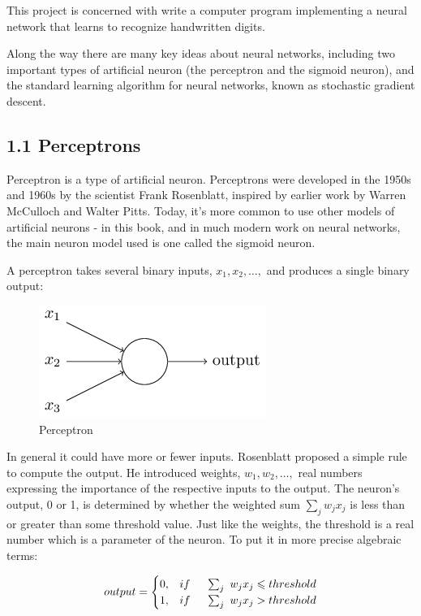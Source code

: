 \documentclass[12 pt]{article}
\begin{document}
This project is concerned with write a computer program implementing a
neural network that learns to recognize handwritten digits.

Along the way there are many key ideas about neural networks, including
two important types of artificial neuron (the perceptron and the sigmoid
neuron), and the standard learning algorithm for neural networks, known
as stochastic gradient descent.

\subsection{1.1 Perceptrons}\label{perceptrons}

Perceptron is a type of artificial neuron. Perceptrons were developed in
the 1950s and 1960s by the scientist Frank Rosenblatt, inspired by
earlier work by Warren McCulloch and Walter Pitts. Today, it's more
common to use other models of artificial neurons - in this book, and in
much modern work on neural networks, the main neuron model used is one
called the sigmoid neuron.

A perceptron takes several binary inputs, $ x_1, x_2, \ldots{}, $
and produces a single binary output:

\begin{figure}[htp]
\centering
\includegraphics{./figs/tikz0.png}
\caption{Perceptron}
\end{figure}

In general it could have more or fewer inputs. Rosenblatt proposed a
simple rule to compute the output. He introduced weights,
$ w_1,w_2,\ldots{},$ real numbers expressing the importance of the respective
inputs to the output. The neuron's output, 0 or 1, is determined by
whether the weighted sum $ \sum_j w_j x_j $ is less than or
greater than some threshold value. Just like the weights, the threshold
is a real number which is a parameter of the neuron. To put it in more
precise algebraic terms:

\begin{equation}
        output =
        \begin{cases}
            0,& if \hspace{0.5 cm} \sum_j\ w_jx_j \leqslant threshold \\
            1,& if \hspace{0.5 cm} \sum_j\ w_jx_j > threshold
        \end{cases}
\end{equation}
\end{document}
